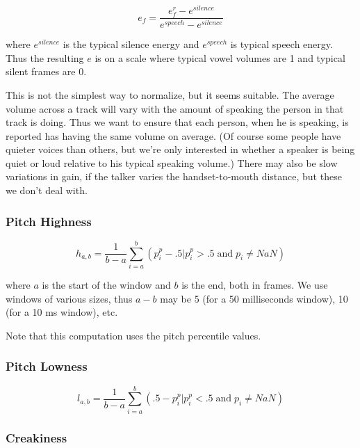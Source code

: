 \documentclass[11pt]{article}
\begin{document}
\begin{equation}
e_f = \frac{ e_f^r - e^{silence} }{e^{speech} - e ^{silence}}
\end{equation}

where $e^{silence}$ is the typical silence energy and $e^{speech}$ is
typical speech energy.  Thus the resulting $e$ is on a scale where
typical vowel volumes are 1 and typical silent frames are 0.

This is not the simplest way to normalize, but it seems suitable.
The average volume across a track will vary with the amount of
speaking the person in that track is doing.  Thus we want to ensure
that each person, when he is speaking, is reported has having the same
volume on average.  (Of course some people have quieter voices than
others, but we're only interested in whether a speaker is being quiet
or loud relative to his typical speaking volume.)  There may also be
slow variations in gain, if the talker varies the handset-to-mouth
distance, but these we don't deal with.

\subsubsection{Pitch Highness}

\begin{equation}
h_{a,b} = \frac{1}{b-a} \sum\limits_{i=a}^b (p_i^p -.5 | p_i^p> .5 \operatorname{and} p_i \neq NaN)
\end{equation}

where $a$ is the start of the window and $b$ is the end, both in
frames.  We use windows of various sizes, thus $a-b$ may be 5 (for a
50 milliseconds window), 10 (for a 10 ms window), etc.

Note that this computation uses the pitch
percentile values.



\subsubsection{Pitch Lowness}

\begin{equation}
l_{a,b} = \frac{1}{b-a} \sum\limits_{i=a}^b ( .5 - p_i^p | p_i^p < .5 \operatorname{and} p_i \neq NaN)
\end{equation}

\subsubsection{Creakiness}
\end{document}

